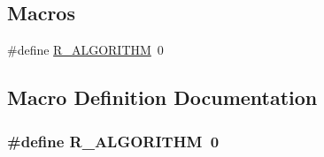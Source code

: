 \subsection*{Macros}
\begin{DoxyCompactItemize}
\item 
\#define \hyperlink{application_8hh_aaeed326368abd712225f9ca34c338fbf}{R\-\_\-\-A\-L\-G\-O\-R\-I\-T\-H\-M}~0
\end{DoxyCompactItemize}


\subsection{Macro Definition Documentation}
\hypertarget{application_8hh_aaeed326368abd712225f9ca34c338fbf}{
\subsubsection[{R\-\_\-\-A\-L\-G\-O\-R\-I\-T\-H\-M}]{\setlength{\rightskip}{0pt plus 5cm}\#define R\-\_\-\-A\-L\-G\-O\-R\-I\-T\-H\-M~0}}\label{application_8hh_aaeed326368abd712225f9ca34c338fbf}
